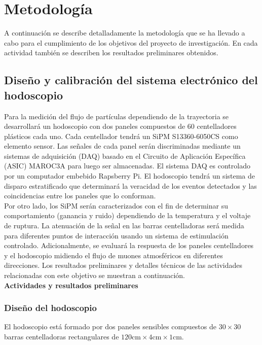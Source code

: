 \chapter{Metodología}

A continuación se describe detalladamente la metodología que se ha llevado a cabo para el cumplimiento de los objetivos del proyecto de investigación. En cada actividad también se describen los resultados preliminares obtenidos.

\section{Diseño y calibración del sistema electrónico del hodoscopio}

Para la medición del flujo de partículas dependiendo de la trayectoria se desarrollará un hodoscopio con dos paneles compuestos de 60 centelladores plásticos cada uno. Cada centellador tendrá un SiPM S13360-6050CS como elemento sensor. Las señales de cada panel serán discriminadas mediante un sistemas de adquisición (DAQ) basado en el Circuito de Aplicación Específica (ASIC) MAROC3A para luego ser almacenadas. El sistema DAQ es controlado por un computador embebido Rapsberry Pi. El hodoscopio tendrá un sistema de disparo estratificado que determinará la veracidad de los eventos detectados y las coincidencias entre los paneles que lo conforman. \\

Por otro lado, los SiPM serán caracterizados con el fin de determinar su comportamiento (ganancia y ruido) dependiendo de la temperatura y el voltaje de ruptura. La atenuación de la señal en las barras centelladoras será medida para diferentes puntos de interacción usando un sistema de estimulación controlado. Adicionalmente, se evaluará la respuesta de los paneles centelladores y el hodoscopio midiendo el flujo de muones atmosféricos en diferentes direcciones. Los resultados preliminares y detalles técnicos de las actividades relacionadas con este objetivo se muestran a continuación.\\


\textbf{Actividades y resultados preliminares}\\

\subsection{Diseño del hodoscopio}

El hodoscopio está formado por dos paneles sensibles compuestos de $30 \times 30$ barras centelladoras rectangulares de $120 \textrm{cm} \times 4 \textrm{cm} \times 1 \textrm{cm}$.\\

